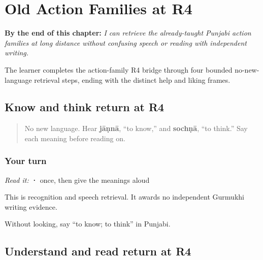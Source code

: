
\chapter{Old Action Families at R4}
\label{ch:pa-action-r4-bridge}

\begin{chapteropening}
\textbf{By the end of this chapter:} \emph{I can retrieve the already-taught Punjabi action families at long distance without confusing speech or reading with independent writing.}

The learner completes the action-family R4 bridge through four bounded no-new-language retrieval steps, ending with the distinct help and liking frames.
\end{chapteropening}

\section[Practice]{Know and think return at R4}

\label{lesson:PA-R24-know-think-r4}



\begin{quote}
No new language. Hear \textbf{jāṇnā}, “to know,” and \textbf{sochṇā}, “to think.” Say each meaning before reading on.
\end{quote}

\subsection*{Your turn}
\emph{Read it:} \textbf{ · } once, then give the meanings aloud

This is recognition and speech retrieval. It awards no independent Gurmukhi writing evidence.

\begin{tcolorbox}[breakable,colback=teal!4,colframe=teal!35!black,title={Before you move on}]
Without looking, say “to know; to think” in Punjabi.
\end{tcolorbox}
\section[Practice]{Understand and read return at R4}

